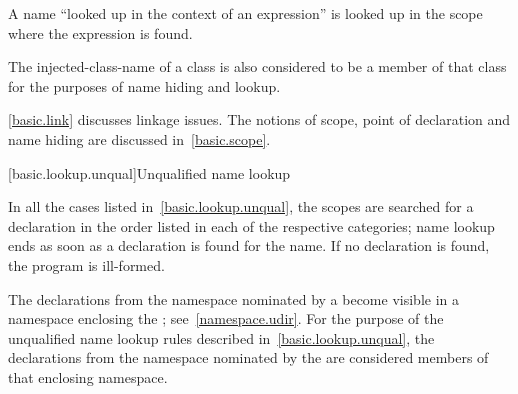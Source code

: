 \pnum
A name ``looked up in the context of an expression'' is looked up
in the scope where the expression is found.

\pnum
The injected-class-name of a class is also
considered to be a member of that class for the purposes of name hiding
and lookup.

\pnum
\begin{note} \ref{basic.link} discusses linkage issues. The notions of
scope, point of declaration and name hiding are discussed
in~\ref{basic.scope}. \end{note}

[basic.lookup.unqual]{Unqualified name lookup}

\pnum
{}%
%
In all the cases listed in~\ref{basic.lookup.unqual}, the scopes are
searched for a declaration in the order listed in each of the respective
categories; name lookup ends as soon as a declaration is found for the
name. If no declaration is found, the program is ill-formed.

\pnum
The declarations from the namespace nominated by a
 become visible in a namespace enclosing the
; see~\ref{namespace.udir}. For the purpose of
the unqualified name lookup rules described
in~\ref{basic.lookup.unqual}, the declarations from the namespace
nominated by the  are considered members of
that enclosing namespace.

